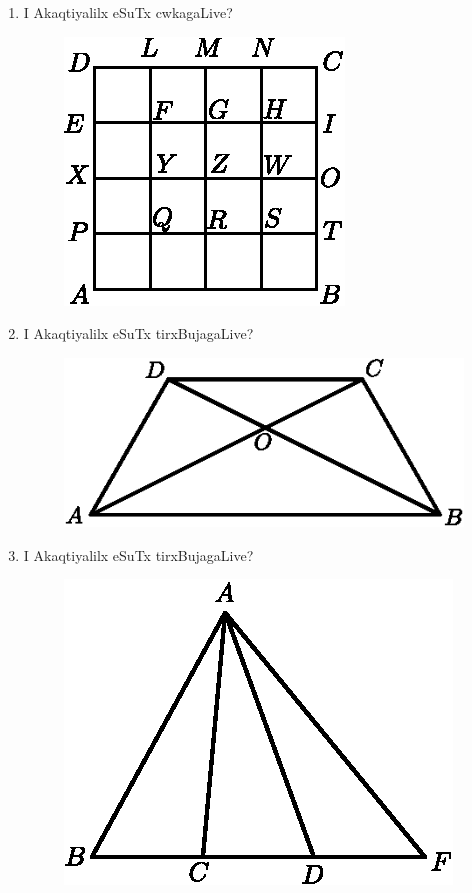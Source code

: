 \begin{enumerate}
\item I Akaqtiyalilx eSuTx cwkagaLive?
\begin{figure}[H]
\centering
\includegraphics{src/figures/exr4.eps}
\end{figure}

\item I Akaqtiyalilx eSuTx tirxBujagaLive?
\begin{figure}[H]
\centering
\includegraphics{src/figures/exr5.eps}
\end{figure}

\eject 

\item I Akaqtiyalilx eSuTx tirxBujagaLive?
\begin{figure}[H]
\centering
\includegraphics{src/figures/exr6.eps}
\end{figure}


\end{enumerate}
